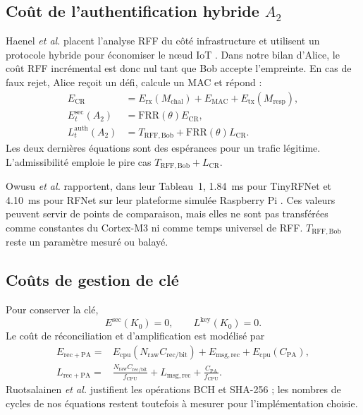 \documentclass[conference,a4paper]{IEEEtran}
\newcommand{\FRR}{\mathrm{FRR}}
\begin{document}
\subsection{Coût de l'authentification hybride $A_2$}
Haenel \emph{et al.} placent l'analyse RFF du côté infrastructure et utilisent un protocole hybride pour économiser le nœud IoT \cite[Secs.~4--6]{haenel2021}. Dans notre bilan d'Alice, le coût RFF incrémental est donc nul tant que Bob accepte l'empreinte. En cas de faux rejet, Alice reçoit un défi, calcule un MAC et répond :
\begin{align}
E_{\mathrm{CR}}&=E_{\mathrm{rx}}(M_{\mathrm{chal}})+E_{\mathrm{MAC}}
+E_{\mathrm{tx}}(M_{\mathrm{resp}}),
\label{eq:challenge-energy}\\
E_t^{\mathrm{sec}}(A_2)&=\FRR(\theta)E_{\mathrm{CR}},
\label{eq:cost-a2}\\
L_t^{\mathrm{auth}}(A_2)&=T_{\mathrm{RFF,Bob}}+
\FRR(\theta)L_{\mathrm{CR}}.
\label{eq:latency-a2}
\end{align}
Les deux dernières équations sont des espérances pour un trafic légitime. L'admissibilité emploie le pire cas $T_{\mathrm{RFF,Bob}}+L_{\mathrm{CR}}$.

Owusu \emph{et al.} rapportent, dans leur Tableau~1, \SI{1.84}{ms} pour TinyRFNet et \SI{4.10}{ms} pour RFNet sur leur plateforme simulée Raspberry Pi \cite[Tab.~1]{owusu2025}. Ces valeurs peuvent servir de points de comparaison, mais elles ne sont pas transférées comme constantes du Cortex-M3 ni comme temps universel de RFF. $T_{\mathrm{RFF,Bob}}$ reste un paramètre mesuré ou balayé.

\subsection{Coûts de gestion de clé}
Pour conserver la clé,
\begin{equation}
    E^{\mathrm{sec}}(K_0)=0,\qquad L^{\mathrm{key}}(K_0)=0.
\end{equation}
Le coût de réconciliation et d'amplification est modélisé par
\begin{align}
E_{\mathrm{rec+PA}}={}&E_{\mathrm{cpu}}(N_{\mathrm{raw}}C_{\mathrm{rec/bit}})
+E_{\mathrm{msg,rec}}+E_{\mathrm{cpu}}(C_{\mathrm{PA}}),
\label{eq:rec-energy}\\
L_{\mathrm{rec+PA}}={}&\frac{N_{\mathrm{raw}}C_{\mathrm{rec/bit}}}{f_{\mathrm{CPU}}}
+L_{\mathrm{msg,rec}}+\frac{C_{\mathrm{PA}}}{f_{\mathrm{CPU}}}.
\label{eq:rec-latency}
\end{align}
Ruotsalainen \emph{et al.} justifient les opérations BCH et SHA-256 \cite[Sec.~III-A]{ruotsalainen2020}; les nombres de cycles de nos équations restent toutefois à mesurer pour l'implémentation choisie.
\end{document}
